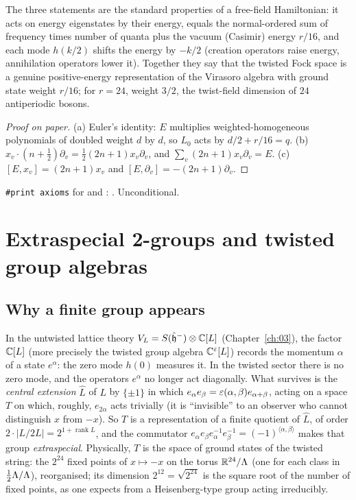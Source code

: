 \begin{physics}
The three statements are the standard properties of a free-field Hamiltonian: it acts on energy eigenstates by their energy, equals the normal-ordered sum of frequency times number of quanta plus the vacuum (Casimir) energy $r/16$, and each mode $h(k/2)$ shifts the energy by $-k/2$ (creation operators raise energy, annihilation operators lower it). Together they say that the twisted Fock space is a genuine positive-energy representation of the Virasoro algebra with ground state weight $r/16$; for $r=24$, weight $3/2$, the twist-field dimension of $24$ antiperiodic bosons.
\end{physics}
\begin{proof}[Proof on paper]
(a) Euler's identity: $E$ multiplies weighted-homogeneous polynomials of doubled weight $d$ by
$d$, so $L_0$ acts by $d/2+r/16=q$.  (b) $x_v\cdot(n+\frac12)\partial_v=\frac12(2n+1)x_v\partial_v$,
and $\sum_v(2n+1)x_v\partial_v=E$.  (c) $[E,x_v]=(2n+1)x_v$ and $[E,\partial_v]=-(2n+1)\partial_v$.
\end{proof}
\begin{status}
\texttt{\#print axioms} for  and : .  Unconditional.
\end{status}

\section{Extraspecial 2-groups and twisted group algebras}\label{ch06:sec:extra}

\subsection{Why a finite group appears}

In the untwisted lattice theory $V_L=S(\hat{\mathfrak h}^-)\otimes{\mathbb{C}}[L]$ (Chapter~\ref{ch:03}), the
factor ${\mathbb{C}}[L]$ (more precisely the twisted group algebra ${\mathbb{C}}^\varepsilon[L]$) records the momentum
$\alpha$ of a state $e^\alpha$: the zero mode $h(0)$ measures it.  In the twisted sector there is no
zero mode, and the operators $e^\alpha$ no longer act diagonally.  What survives is the
\emph{central extension} $\hat L$ of $L$ by $\{\pm1\}$ in which $e_\alpha e_\beta=\varepsilon(\alpha,
\beta)e_{\alpha+\beta}$, acting on a space $T$ on which, roughly, $e_{2\alpha}$ acts trivially (it is
``invisible'' to an observer who cannot distinguish $x$ from $-x$).  So $T$ is a representation of a
finite quotient of $\hat L$, of order $2\cdot|L/2L|=2^{1+\operatorname{rank}L}$, and the commutator
$e_\alpha e_\beta e_\alpha^{-1}e_\beta^{-1}=(-1)^{\langle\alpha,\beta\rangle}$ makes that group
\emph{extraspecial}.  Physically, $T$ is the space of ground states of the twisted string: the
$2^{24}$ fixed points of $x\mapsto-x$ on the torus $\mathbb R^{24}/{\Lambda}$ (one for each class in
$\frac12{\Lambda}/{\Lambda}$), reorganised; its dimension $2^{12}=\sqrt{2^{24}}$ is the square root of the
number of fixed points, as one expects from a Heisenberg-type group acting irreducibly.


